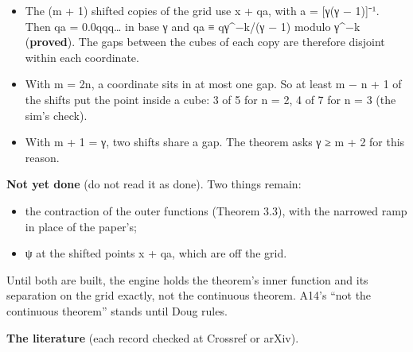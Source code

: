 \begin{enumerate}
\begin{itemize}
\item The (m + 1) shifted copies of the grid use x + qa, with a = [γ(γ − 1)]⁻¹. Then qa = 0.0qqq… in base γ and qa ≡ qγ\textasciicircum{}−k/(γ − 1) modulo γ\textasciicircum{}−k (\textbf{proved}). The gaps between the cubes of each copy are therefore disjoint within each coordinate.
\item With m = 2n, a coordinate sits in at most one gap. So at least m − n + 1 of the shifts put the point inside a cube: 3 of 5 for n = 2, 4 of 7 for n = 3 (the sim's check).
\item With m + 1 = γ, two shifts share a gap. The theorem asks γ ≥ m + 2 for this reason.
\end{itemize}
\end{enumerate}

\textbf{Not yet done} (do not read it as done). Two things remain:

\begin{itemize}
\item the contraction of the outer functions (Theorem 3.3), with the narrowed ramp in place of the paper's;
\item ψ at the shifted points x + qa, which are off the grid.
\end{itemize}

Until both are built, the engine holds the theorem's inner function and its separation on the grid exactly, not the continuous theorem. A14's “not the continuous theorem” stands until Doug rules.

\textbf{The literature} (each record checked at Crossref or arXiv).


